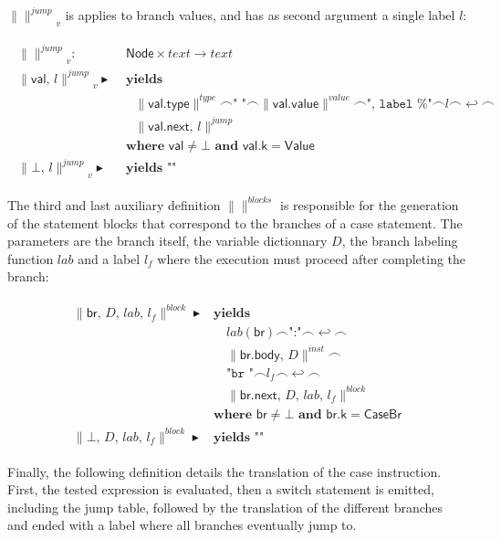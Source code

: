 \documentclass{article}
\newcommand{\trad}[2]{\ensuremath{\lVert \textsf{#1} \rVert^{\textit{#2}}}}
\newcommand{\nl}[0]{\ensuremath{\hookleftarrow}}
\DeclareMathOperator{\conc}{\smallfrown}
\DeclareMathOperator{\isdef}{\blacktriangleright}
\begin{document}
$\trad{}{jump}_v$ is applies to branch values, and has as second argument a single label $l$:
\begin{framed}
  \begin{align}
\begin{split}
    \trad{}{jump}_v : & \textsf{ Node} \times text \rightarrow text \\
    \trad{val, $l$}{jump}_v \isdef
    & \textbf{ yields }  \\
    & \quad \trad{val.type}{type} \conc \texttt{" "} \conc 
    \trad{val.value}{value} \conc \texttt{", label \%"} \conc l \conc \nl \conc \\
    & \quad \trad{val.next, $l$}{jump}  \\
    & \textbf{ where } \textsf{val} \ne \bot \textbf{ and } \textsf{val.k} = \textsf{Value}  \\
    \trad{$\bot$, $l$}{jump}_v \isdef
    & \textbf{ yields } \texttt{""} 
  \end{split}
\end{align}
\end{framed}

The third and last auxiliary definition $\trad{}{blocks}$ is
responsible for the generation of the statement blocks that correspond
to the branches of a case statement. The parameters are the branch
itself, the variable dictionnary $D$, the branch labeling function
$lab$ and a label $l_f$ where the execution must proceed after
completing the branch:
\begin{framed}
\begin{align}
\begin{split}
  \trad{br, $D$, $lab$, $l_f$}{block} \isdef 
  & \textbf{yields } \\
  & \quad lab(\textsf{br}) \conc \texttt{":"} \conc \nl \conc  \\
  & \quad \trad{br.body, $D$}{inst} \conc  \\
  & \quad \texttt{"br "} \conc l_f \conc \nl \conc  \\
  & \quad \trad{br.next, $D$, $lab$, $l_f$}{block}  \\
  & \textbf{where } \textsf{br} \ne \bot \textbf{ and } \textsf{br.k} = \textsf{CaseBr}  \\
  \trad{$\bot$, $D$, $lab$, $l_f$}{block} \isdef 
  & \textbf{yields } \texttt{""}
\end{split}
\end{align}
\end{framed}

Finally, the following definition details the translation of the case
instruction. First, the tested expression is evaluated, then a switch
statement is emitted, including the jump table, followed by the
translation of the different branches and ended with a label where all
branches eventually jump to.
\end{document}
